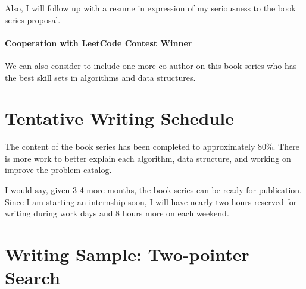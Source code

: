 \documentclass[12pt]{article}
\begin{document}
Also, I will follow up with a resume in expression of my seriousness to the book series proposal. 

\paragraph{Cooperation with LeetCode Contest Winner} We can also consider to include one more co-author on this book series who has the best skill sets in algorithms and data structures.

\section{Tentative Writing Schedule}

The content of the book series has been completed to approximately 80\%. There is more work to better explain each algorithm, data structure, and working on improve the problem catalog. 

I would say, given 3-4 more months, the book series can be ready for publication. Since I am starting an internship soon, I will have nearly two hours reserved for writing during work days and 8 hours more on each weekend. 
\section{Writing Sample: Two-pointer Search}



\end{document}
